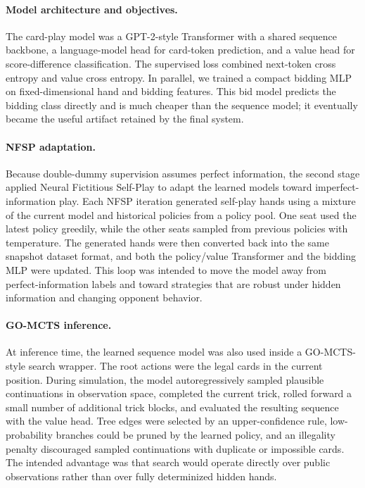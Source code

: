 \documentclass{article}
\begin{document}
\paragraph{Model architecture and objectives.}
The card-play model was a GPT-2-style Transformer with a shared sequence backbone, a language-model head for card-token prediction, and a value head for score-difference classification. The supervised loss combined next-token cross entropy and value cross entropy. In parallel, we trained a compact bidding MLP on fixed-dimensional hand and bidding features. This bid model predicts the bidding class directly and is much cheaper than the sequence model; it eventually became the useful artifact retained by the final system.

\paragraph{NFSP adaptation.}
Because double-dummy supervision assumes perfect information, the second stage applied Neural Fictitious Self-Play to adapt the learned models toward imperfect-information play. Each NFSP iteration generated self-play hands using a mixture of the current model and historical policies from a policy pool. One seat used the latest policy greedily, while the other seats sampled from previous policies with temperature. The generated hands were then converted back into the same snapshot dataset format, and both the policy/value Transformer and the bidding MLP were updated. This loop was intended to move the model away from perfect-information labels and toward strategies that are robust under hidden information and changing opponent behavior.

\paragraph{GO-MCTS inference.}
At inference time, the learned sequence model was also used inside a GO-MCTS-style search wrapper. The root actions were the legal cards in the current position. During simulation, the model autoregressively sampled plausible continuations in observation space, completed the current trick, rolled forward a small number of additional trick blocks, and evaluated the resulting sequence with the value head. Tree edges were selected by an upper-confidence rule, low-probability branches could be pruned by the learned policy, and an illegality penalty discouraged sampled continuations with duplicate or impossible cards. The intended advantage was that search would operate directly over public observations rather than over fully determinized hidden hands.
\end{document}
